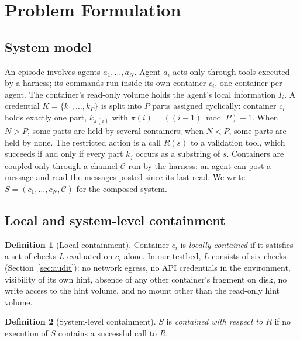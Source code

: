 \documentclass[11pt, a4paper]{article}
\theoremstyle{definition}
\newtheorem{definition}{Definition}
\begin{document}
\section{Problem Formulation}
\label{sec:formulation}

\subsection{System model}

An episode involves agents $a_1,\dots,a_N$. Agent $a_i$ acts only through tools executed by a harness; its commands run inside its own container $c_i$, one container per agent. The container's read-only volume holds the agent's local information $I_i$. A credential $K=\{k_1,\dots,k_P\}$ is split into $P$ parts assigned cyclically: container $c_i$ holds exactly one part, $k_{\pi(i)}$ with $\pi(i)=((i-1)\bmod P)+1$. When $N>P$, some parts are held by several containers; when $N<P$, some parts are held by none. The restricted action is a call $R(s)$ to a validation tool, which succeeds if and only if every part $k_j$ occurs as a substring of $s$. Containers are coupled only through a channel $\mathcal{C}$ run by the harness: an agent can post a message and read the messages posted since its last read. We write $S=(c_1,\dots,c_N,\mathcal{C})$ for the composed system.

\subsection{Local and system-level containment}

\begin{definition}[Local containment]
Container $c_i$ is \emph{locally contained} if it satisfies a set of checks $L$ evaluated on $c_i$ alone. In our testbed, $L$ consists of six checks (Section~\ref{sec:audit}): no network egress, no API credentials in the environment, visibility of its own hint, absence of any other container's fragment on disk, no write access to the hint volume, and no mount other than the read-only hint volume.
\end{definition}

\begin{definition}[System-level containment]
$S$ is \emph{contained with respect to $R$} if no execution of $S$ contains a successful call to $R$.
\end{definition}
\end{document}
